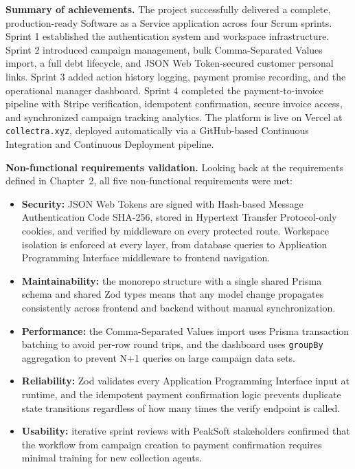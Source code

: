 \documentclass[12pt,a4paper]{report}
\begin{document}
\textbf{Summary of achievements.}
The project successfully delivered a complete, production-ready Software as a Service application
across four Scrum sprints.
Sprint 1 established the authentication system and workspace infrastructure.
Sprint 2 introduced campaign management, bulk Comma-Separated Values import, a full debt lifecycle,
and JSON Web Token-secured customer personal links.
Sprint 3 added action history logging, payment promise recording, and the operational
manager dashboard.
Sprint 4 completed the payment-to-invoice pipeline with Stripe verification,
idempotent confirmation, secure invoice access, and synchronized campaign
tracking analytics.
The platform is live on Vercel at \texttt{collectra.xyz}, deployed automatically
via a GitHub-based Continuous Integration and Continuous Deployment pipeline.

\textbf{Non-functional requirements validation.}
Looking back at the requirements defined in Chapter~2, all five non-functional
requirements were met:
\begin{itemize}
  \item \textbf{Security:} JSON Web Tokens are signed with Hash-based Message Authentication Code SHA-256, stored in
        Hypertext Transfer Protocol-only cookies, and verified by middleware on every protected route.
        Workspace isolation is enforced at every layer, from database queries to
        Application Programming Interface middleware to frontend navigation.
  \item \textbf{Maintainability:} the monorepo structure with a single shared
        Prisma schema and shared Zod types means that any model change propagates
        consistently across frontend and backend without manual synchronization.
  \item \textbf{Performance:} the Comma-Separated Values import uses Prisma transaction batching to
        avoid per-row round trips, and the dashboard uses \texttt{groupBy}
        aggregation to prevent N+1 queries on large campaign data sets.
  \item \textbf{Reliability:} Zod validates every Application Programming Interface input at runtime, and the
        idempotent payment confirmation logic prevents duplicate state transitions
        regardless of how many times the verify endpoint is called.
  \item \textbf{Usability:} iterative sprint reviews with PeakSoft stakeholders
        confirmed that the workflow from campaign creation to payment confirmation
        requires minimal training for new collection agents.
\end{itemize}
\end{document}

